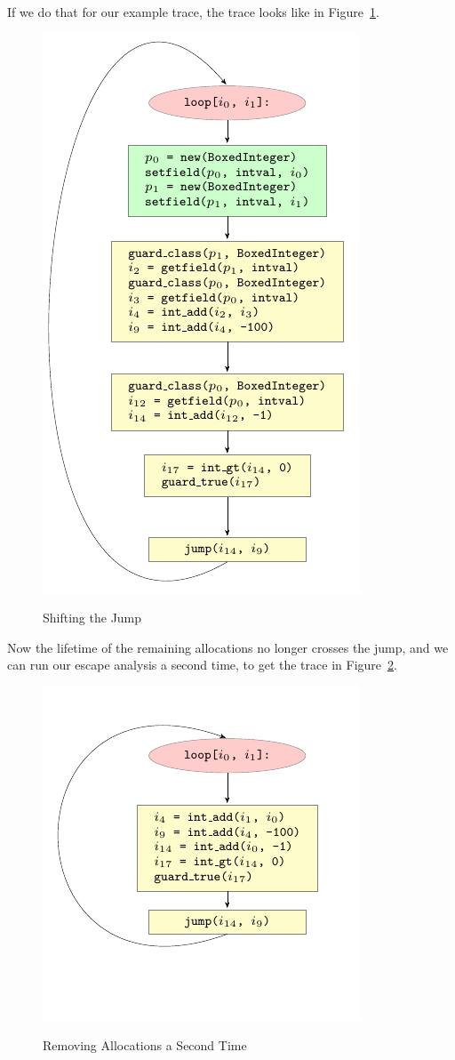 \documentclass{sigplanconf}
\begin{document}
If we do that for our example trace, the trace looks like in Figure~\ref{fig:step2}.

\begin{figure}
\includegraphics{figures/step2.pdf}
\label{fig:step2}
\caption{Shifting the Jump}
\end{figure}


Now the lifetime of the remaining allocations no longer crosses the jump, and
we can run our escape analysis a second time, to get the trace in
Figure~\ref{fig:step3}.

\begin{figure}
\includegraphics{figures/step3.pdf}
\label{fig:step3}
\caption{Removing Allocations a Second Time}
\end{figure}
\end{document}
